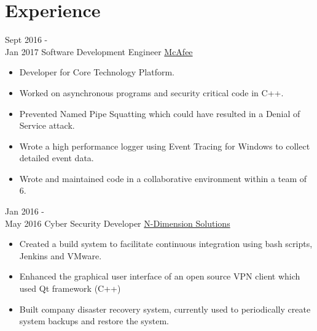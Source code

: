\documentclass[letterpaper]{twentysecondcv} %
\begin{document}
\makeprofile %



\section{Experience}

\begin{twenty} %
	\twentyitem
    	{Sept 2016 - \\Jan 2017}
        {Software Development Engineer}
        {\href{https://www.mcafee.com/ca/index.html}{ McAfee}}
        {}
        {
        {\begin{itemize}
        \item Developer for Core Technology Platform.
        \item Worked on asynchronous programs and security critical code in C++. 
        \item Prevented Named Pipe Squatting which could have resulted in a Denial of Service attack.
        \item Wrote a high performance logger using Event Tracing for Windows to collect detailed event data.
        \item Wrote and maintained code in a collaborative environment within a team of 6.
    \end{itemize}}
        }
        
    \twentyitem
   		{Jan 2016 - \\ May 2016}
        {Cyber Security Developer}
        {\href{https://www.n-dimension.com}{N-Dimension Solutions}}
        {}
        {
        {\begin{itemize}
        \item Created a build system to facilitate continuous integration using bash scripts, Jenkins and VMware.
        \item Enhanced the graphical user interface of an open source VPN client which used Qt framework (C++)
        \item Built company disaster recovery system, currently used to periodically create system backups and restore the system. 
    \end{itemize}}
        }
        

\end{twenty}
\end{document}

